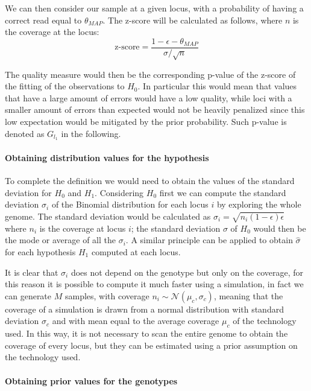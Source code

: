 \documentclass{article}
\begin{document}
We can then consider our sample at a given locus, with a probability
of having a correct read equal to $\theta_{MAP}$.  The z-score will be
calculated as follows, where $n$ is the coverage at the locus:
\begin{equation*}
  \mbox{z-score} = \dfrac{1-\epsilon - \theta_{MAP}}{\sigma / \sqrt{n}}
\end{equation*}
        
The quality measure would then be the corresponding p-value of the
z-score of the fitting of the observations to $H_0$.  In particular
this would mean that values that have a large amount of errors would
have a low quality, while loci with a smaller amount of errors than
expected would not be heavily penalized since this low expectation
would be mitigated by the prior probability.  Such p-value is denoted
as $G_{l_1}$ in the following.

\paragraph{Obtaining distribution values for the hypothesis}

To complete the definition we would need to obtain the values of the
standard deviation for $H_0$ and $H_1$.  Considering $H_0$ first we
can compute the standard deviation $\sigma_i$ of the Binomial
distribution for each locus $i$ by exploring the whole genome.  The
standard deviation would be calculated as
$\sigma_i = \sqrt{n_i (1-\epsilon) \epsilon}$ where $n_i$ is the
coverage at locus $i$; the standard deviation $\sigma$ of $H_0$ would
then be the mode or average of all the $\sigma_i$.  A similar
principle can be applied to obtain $\hat{\sigma}$ for each hypothesis
$H_1$ computed at each locus.

It is clear that $\sigma_i$ does not depend on the genotype but only
on the coverage, for this reason it is possible to compute it much
faster using a simulation, in fact we can generate $M$ samples, with
coverage $n_i \sim \mathcal{N}(\mu_c, \sigma_c)$, meaning that the
coverage of a simulation is drawn from a normal distribution with
standard deviation $\sigma_c$ and with mean equal to the average
coverage $\mu_c$ of the technology used.  In this way, it is not
necessary to scan the entire genome to obtain the coverage of every
locus, but they can be estimated using a prior assumption on the
technology used.

\paragraph{Obtaining prior values for the genotypes}
\end{document}
